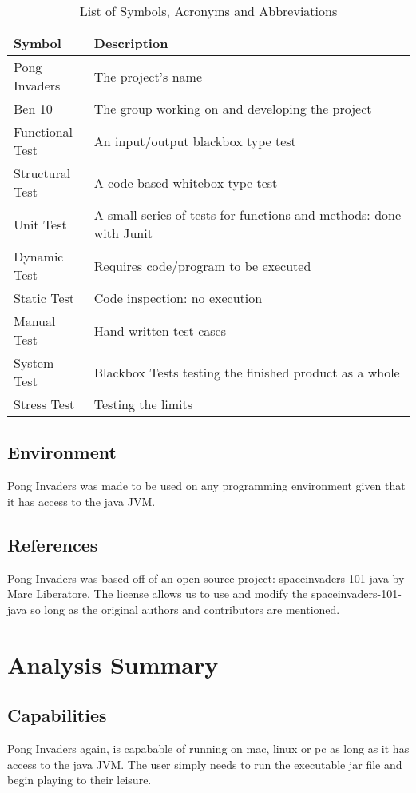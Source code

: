 \documentclass[12pt, oneside]{article}
\begin{document}
\begin{table}[h]
\caption{List of Symbols, Acronyms and Abbreviations}
\label{symbtable}
\begin{tabular}{p{0.2\linewidth} || p{0.8\linewidth}}
\hline
\textbf{Symbol} & \textbf{Description} \\
\hline
Pong Invaders &  The project's name \\
Ben 10 & The group working on and developing the project\\
Functional Test & An input/output blackbox type test \\
Structural Test & A code-based whitebox type test \\
Unit Test & A small series of tests for functions and methods: done with Junit \\
Dynamic Test & Requires code/program to be executed \\
Static Test & Code inspection: no execution \\
Manual Test & Hand-written test cases \\
System Test & Blackbox Tests testing the finished product as a whole \\
Stress Test & Testing the limits \\
\hline
\end{tabular}
\end{table}

\clearpage

\subsection{Environment}
Pong Invaders was made to be used on any programming environment given that it has access to the java JVM.   
\subsection{References}
Pong Invaders was based off of an open source project: spaceinvaders-101-java by Marc Liberatore. The license allows us to use and modify the  spaceinvaders-101-java so long as the original authors and contributors are mentioned. 


\section{Analysis Summary}

\subsection{Capabilities}
Pong Invaders again, is capabable of running on mac, linux or pc as long as it has access to the java JVM. The user simply needs to run the executable jar file and begin playing to their leisure. 
\end{document}
